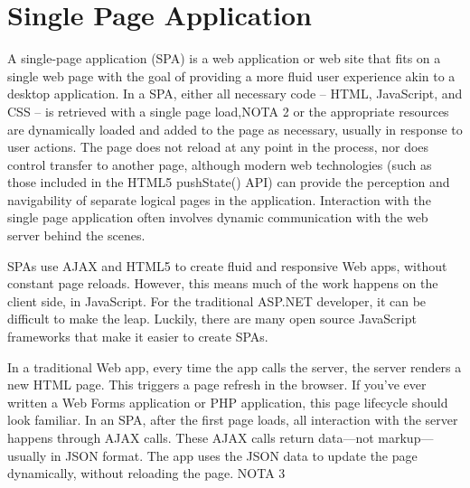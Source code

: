 \section{Single Page Application}
\label{sec:ARC_overview}

A single-page application (SPA) is a web application or web site that fits on a single web page with the goal of providing a more fluid user experience akin to a desktop application. In a SPA, either all necessary code – HTML, JavaScript, and CSS – is retrieved with a single page load,NOTA 2 or the appropriate resources are dynamically loaded and added to the page as necessary, usually in response to user actions. The page does not reload at any point in the process, nor does control transfer to another page, although modern web technologies (such as those included in the HTML5 pushState() API) can provide the perception and navigability of separate logical pages in the application. Interaction with the single page application often involves dynamic communication with the web server behind the scenes.

SPAs use AJAX and HTML5 to create fluid and responsive Web apps, without constant page reloads. However, this means much of the work happens on the client side, in JavaScript. For the traditional ASP.NET developer, it can be difficult to make the leap. Luckily, there are many open source JavaScript frameworks that make it easier to create SPAs.

In a traditional Web app, every time the app calls the server, the server renders a new HTML page. This triggers a page refresh in the browser. If you’ve ever written a Web Forms application or PHP application, this page lifecycle should look familiar.
In an SPA, after the first page loads, all interaction with the server happens through AJAX calls. These AJAX calls return data—not markup—usually in JSON format. The app uses the JSON data to update the page dynamically, without reloading the page. NOTA 3

